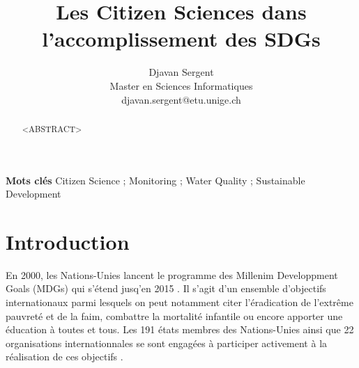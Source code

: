 \documentclass[10pt, conference, compsocconf]{llncs}
\begin{document}
%
\title{Les Citizen Sciences dans\\l'accomplissement des SDGs}





% 
\author{Djavan Sergent \\
Master en Sciences Informatiques \\
djavan.sergent@etu.unige.ch}




\maketitle


\begin{abstract}
	<ABSTRACT>
\end{abstract}


\textbf{Mots clés} Citizen Science ; Monitoring ; Water Quality ; Sustainable Development


\section{Introduction}
	En 2000, les Nations-Unies lancent le programme des Millenim Developpment Goals (MDGs) qui s'étend jusq'en 2015 \cite{united_nations_millennium_2009}. Il s'agit d'un ensemble d'objectifs internationaux parmi lesquels on peut notamment citer l'éradication de l'extrême pauvreté et de la faim, combattre la mortalité infantile ou encore apporter une éducation à toutes et tous. Les 191 états membres des Nations-Unies ainsi que 22 organisations internationnales se sont engagées à participer activement à la réalisation de ces objectifs \cite{wikipedia_millennium_2017}.
	
\end{document}
